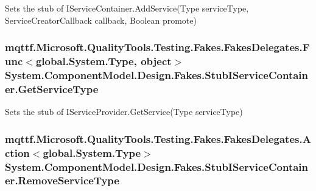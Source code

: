 Sets the stub of I\-Service\-Container.\-Add\-Service(\-Type service\-Type, Service\-Creator\-Callback callback, Boolean promote)

\hypertarget{class_system_1_1_component_model_1_1_design_1_1_fakes_1_1_stub_i_service_container_a72f04cbe9215a01e9e8874750e95d0c1}{
\subsubsection[{Get\-Service\-Type}]{\setlength{\rightskip}{0pt plus 5cm}mqttf.\-Microsoft.\-Quality\-Tools.\-Testing.\-Fakes.\-Fakes\-Delegates.\-Func$<$global.\-System.\-Type, object$>$ System.\-Component\-Model.\-Design.\-Fakes.\-Stub\-I\-Service\-Container.\-Get\-Service\-Type}}\label{class_system_1_1_component_model_1_1_design_1_1_fakes_1_1_stub_i_service_container_a72f04cbe9215a01e9e8874750e95d0c1}


Sets the stub of I\-Service\-Provider.\-Get\-Service(\-Type service\-Type)

\hypertarget{class_system_1_1_component_model_1_1_design_1_1_fakes_1_1_stub_i_service_container_ac23245425838ba2edde3846a732a52f0}{
\subsubsection[{Remove\-Service\-Type}]{\setlength{\rightskip}{0pt plus 5cm}mqttf.\-Microsoft.\-Quality\-Tools.\-Testing.\-Fakes.\-Fakes\-Delegates.\-Action$<$global.\-System.\-Type$>$ System.\-Component\-Model.\-Design.\-Fakes.\-Stub\-I\-Service\-Container.\-Remove\-Service\-Type}}\label{class_system_1_1_component_model_1_1_design_1_1_fakes_1_1_stub_i_service_container_ac23245425838ba2edde3846a732a52f0}


